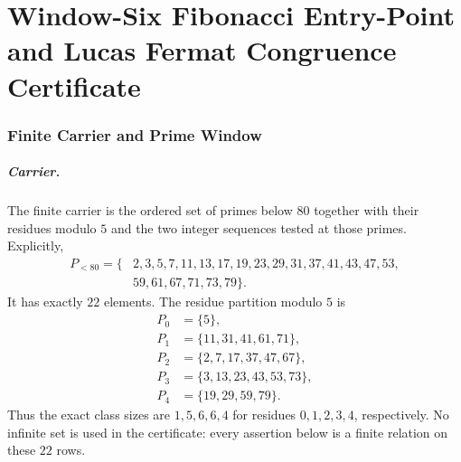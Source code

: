 \chapter{Window-Six Fibonacci Entry-Point and Lucas Fermat Congruence Certificate}
\label{ch:window6-fib-entry-point-fermat-congruence-law-certificate}

\subsection{Finite Carrier and Prime Window}
\label{sec:window6-fib-entry-point-carrier}

\paragraph{Carrier.}
The finite carrier is the ordered set of primes below $80$ together with their residues modulo $5$ and the two integer sequences tested at those primes. Explicitly,
$$
\begin{aligned}
P_{<80} = \{&2,3,5,7,11,13,17,19,23,29,31,37,41,43,47,53,\\
&59,61,67,71,73,79\}.
\end{aligned}
$$
It has exactly $22$ elements. The residue partition modulo $5$ is
$$
\begin{aligned}
P_0 &= \{5\},\\
P_1 &= \{11,31,41,61,71\},\\
P_2 &= \{2,7,17,37,47,67\},\\
P_3 &= \{3,13,23,43,53,73\},\\
P_4 &= \{19,29,59,79\}.
\end{aligned}
$$
Thus the exact class sizes are $1,5,6,6,4$ for residues $0,1,2,3,4$, respectively. No infinite set is used in the certificate: every assertion below is a finite relation on these $22$ rows.

